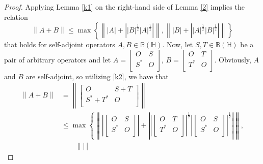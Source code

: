 \documentclass[12pt,twoside,reqno]{amsart}
\numberwithin{equation}{section}
\begin{document}
\begin{proof}
Applying Lemma \ref{k1} on the right-hand side of Lemma \ref{2} implies the relation
\begin{equation}\label{k2}
\left\| A+B \right\|\le \max \left\{ \left\| \left| A \right|+\left| {{\left| B \right|}^{\frac{1}{2}}}{{\left| A \right|}^{\frac{1}{2}}} \right| \right\|,\left\| \left| B \right|+\left| {{\left| A \right|}^{\frac{1}{2}}}{{\left| B \right|}^{\frac{1}{2}}} \right| \right\| \right\}
\end{equation}
that holds for self-adjoint operators  $A,B\in \mathbb B\left( \mathbb H \right)$.
Now, let $S,T\in \mathbb B\left( \mathbb H \right)$ be a pair of arbitrary operators and let $A=\left[ \begin{matrix}
   O & S  \\
   {{S}^{*}} & O  \\
\end{matrix} \right]$, $B=\left[ \begin{matrix}
   O & T  \\
   {{T}^{*}} & O  \\
\end{matrix} \right]$.
Obviously, $A$ and $B$ are self-adjoint, so utilizing \eqref{k2}, we have that
\[\begin{aligned}
   \left\| A+B \right\|&=\left\| \left[ \begin{matrix}
   O & S+T  \\
   {{S}^{*}}+{{T}^{*}} & O  \\
\end{matrix} \right] \right\| \\
 & \le \max \left\{ \left\| \left| \left[ \begin{matrix}
   O & S  \\
   {{S}^{*}} & O  \\
\end{matrix} \right] \right|+\left| {{\left| \left[ \begin{matrix}
   O & T  \\
   {{T}^{*}} & O  \\
\end{matrix} \right] \right|}^{\frac{1}{2}}}{{\left| \left[ \begin{matrix}
   O & S  \\
   {{S}^{*}} & O  \\
\end{matrix} \right] \right|}^{\frac{1}{2}}} \right| \right\|,\right. \\
 &\qquad \left. \left\| \left| \left[ \begin{matrix}

\end{matrix}
\end{aligned}\]
\end{proof}
\end{document}
